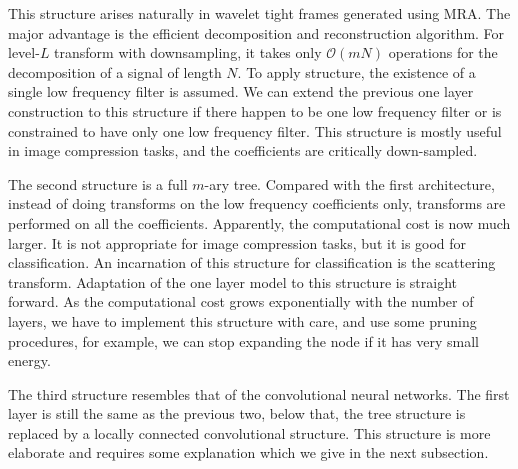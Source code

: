 \documentclass[a4paper]{article}
\begin{document}
This structure arises naturally in wavelet tight frames generated using MRA. The major advantage is the efficient decomposition and reconstruction algorithm. For level-$L$ transform with downsampling, it takes only $\mathcal O(mN)$ operations for the decomposition of a signal of length $N$. To apply structure, the existence of a single low frequency filter is assumed. We can extend the previous one layer construction to this structure if there happen to be one low frequency filter or is constrained to have only one low frequency filter.  This structure is mostly useful in image compression tasks, and the coefficients are critically down-sampled.

The second structure is a full $m$-ary tree. Compared with the first architecture, instead of doing transforms on the low frequency coefficients only,  transforms are performed on all the coefficients.  Apparently, the computational cost is now much larger. It is not appropriate for image compression tasks, but it is good for classification. An incarnation of this structure for classification is the scattering transform\cite{bruna2013invariant}. Adaptation of the one layer model to this structure is straight forward. As the computational cost grows exponentially with the number of layers, we have to implement this structure with care, and use some pruning procedures, for example, we can stop expanding the node if it has very small energy.

The third structure resembles that of the convolutional neural networks. The first layer is still the same as the previous two, below that, the tree structure is replaced by a  locally connected  convolutional structure. This structure is more elaborate and requires some explanation which we give in the next subsection.
\end{document}
